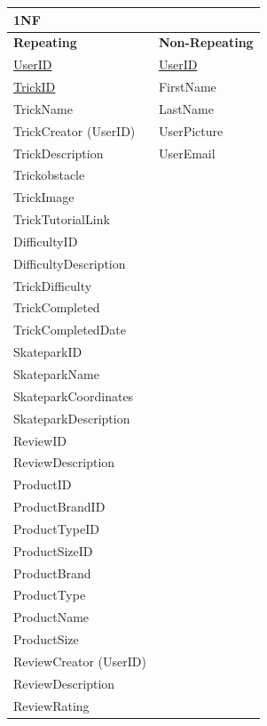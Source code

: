 \begin{center}
\begin{tabular}{|p{4cm}|p{4cm}|}  \hline
\textbf{1NF} & \\ \hline
\textbf{Repeating} & \textbf{Non-Repeating} \\ \hline
\underline{UserID} & \underline{UserID} \\ 
\underline{TrickID} & FirstName \\ 
TrickName & LastName \\
TrickCreator (UserID) & UserPicture \\
TrickDescription & UserEmail \\
Trickobstacle & \\
TrickImage & \\
TrickTutorialLink & \\
DifficultyID & \\
DifficultyDescription & \\
TrickDifficulty & \\ 
TrickCompleted & \\
TrickCompletedDate \\
SkateparkID & \\
SkateparkName & \\
SkateparkCoordinates & \\
SkateparkDescription & \\
ReviewID & \\
ReviewDescription & \\
ProductID & \\
ProductBrandID & \\
ProductTypeID & \\
ProductSizeID & \\
ProductBrand & \\
ProductType & \\
ProductName & \\
ProductSize & \\

ReviewCreator (UserID) & \\
ReviewDescription & \\
ReviewRating & \\ \hline


\end{tabular}
\label{tab:1NF User Database}
\end{center}


